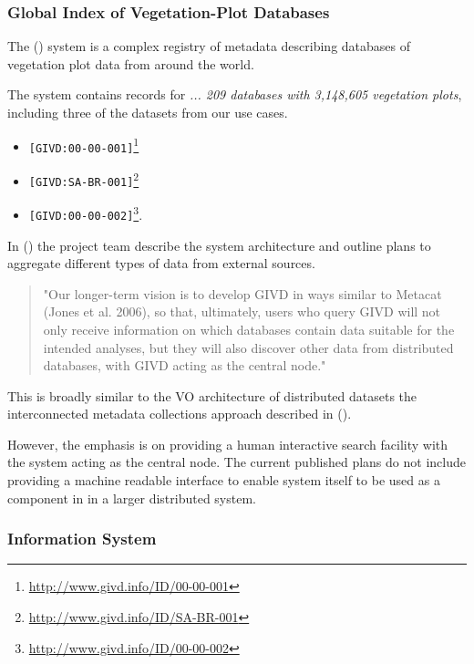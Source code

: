 \documentclass{article}
\begin{document}
\subsubsection{Global Index of Vegetation-Plot Databases}

The  (\cite{givd}) system is a complex registry of metadata describing
databases of vegetation plot data from around the world.

The \cite{givd} system contains records for
\textit{ ... 209 databases with 3,148,605 vegetation plots},
including three of the datasets from our use cases.

\begin{itemize}
\item \cite{forest-plots} \texttt{[GIVD:00-00-001]}\footnote{\url{http://www.givd.info/ID/00-00-001}}
\item \cite{ppbio} \texttt{[GIVD:SA-BR-001]}\footnote{\url{http://www.givd.info/ID/SA-BR-001}}
\item \cite{team}  \texttt{[GIVD:00-00-002]}\footnote{\url{http://www.givd.info/ID/00-00-002}}.
\end{itemize}

In  (\cite{dengler-2011}) the \cite{givd} project team describe the system
architecture and outline plans to aggregate different types of data from external sources.

\begin{quote}
"Our longer-term vision is to develop GIVD in ways similar to Metacat (Jones et
al. 2006), so that, ultimately, users who query GIVD will not only receive
information on which databases contain data suitable for the intended analyses,
but they will also discover other data from distributed databases, with GIVD
acting as the central node."
\end{quote}

This is broadly similar to the VO architecture of distributed datasets
the interconnected metadata collections approach described in
 (\cite{jones-2006}).

However, the emphasis is on providing a human interactive search facility
with the \cite{givd} system acting as the central node.
The current published plans do not include providing a machine readable
interface to enable \cite{givd} system itself to be used as a component in
in a larger distributed system.

\subsubsection{\cite{ppbio} Information System}
\end{document}
